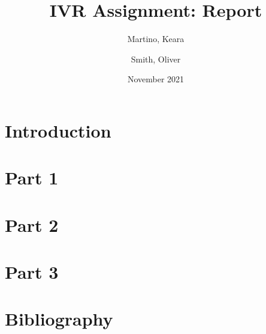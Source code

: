 \documentclass{article}
\title{IVR Assignment: Report}
\author{
  Martino, Keara\\
  \and
  Smith, Oliver\\
}
\date{November 2021}
\begin{document}
\maketitle

\section{Introduction}
\section{Part 1}
\section{Part 2}
\section{Part 3}
\section{Bibliography}
\end{document}
